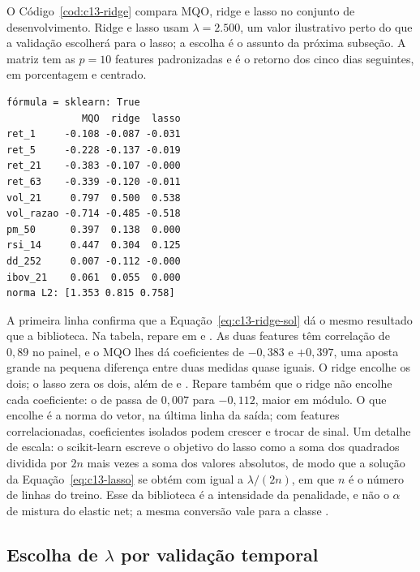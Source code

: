 O Código~\ref{cod:c13-ridge} compara MQO, ridge e lasso no conjunto de desenvolvimento. Ridge e lasso usam $\lambda = 2.500$, um valor ilustrativo perto do que a validação escolherá para o lasso; a escolha é o assunto da próxima subseção. A matriz  tem as $p = 10$ features padronizadas e  é o retorno dos cinco dias seguintes, em porcentagem e centrado.


\begin{lstlisting}[style=saida]
fórmula = sklearn: True
             MQO  ridge  lasso
ret_1     -0.108 -0.087 -0.031
ret_5     -0.228 -0.137 -0.019
ret_21    -0.383 -0.107 -0.000
ret_63    -0.339 -0.120 -0.011
vol_21     0.797  0.500  0.538
vol_razao -0.714 -0.485 -0.518
pm_50      0.397  0.138  0.000
rsi_14     0.447  0.304  0.125
dd_252     0.007 -0.112 -0.000
ibov_21    0.061  0.055  0.000
norma L2: [1.353 0.815 0.758]
\end{lstlisting}

A primeira linha confirma que a Equação~\eqref{eq:c13-ridge-sol} dá o mesmo resultado que a biblioteca. Na tabela, repare em  e . As duas features têm correlação de $0,89$ no painel, e o MQO lhes dá coeficientes de $-0,383$ e $+0,397$, uma aposta grande na pequena diferença entre duas medidas quase iguais. O ridge encolhe os dois; o lasso zera os dois, além de  e . Repare também que o ridge não encolhe cada coeficiente: o de  passa de $0,007$ para $-0,112$, maior em módulo. O que encolhe é a norma do vetor, na última linha da saída; com features correlacionadas, coeficientes isolados podem crescer e trocar de sinal. Um detalhe de escala: o scikit-learn escreve o objetivo do lasso como a soma dos quadrados dividida por $2n$ mais  vezes a soma dos valores absolutos, de modo que a solução da Equação~\eqref{eq:c13-lasso} se obtém com  igual a $\lambda/(2n)$, em que $n$ é o número de linhas do treino. Esse  da biblioteca é a intensidade da penalidade, e não o $\alpha$ de mistura do elastic net; a mesma conversão vale para a classe .

\subsection{Escolha de \texorpdfstring{$\lambda$}{lambda} por validação temporal}

